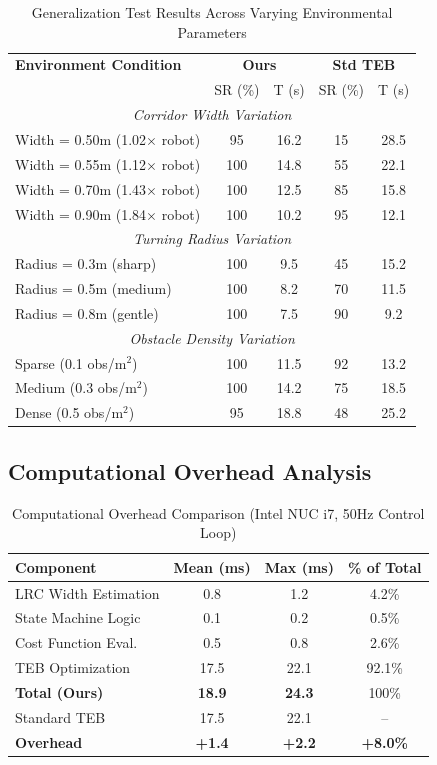 \documentclass[lettersize,journal]{IEEEtran}
\begin{document}
\begin{table}[htbp]
\centering
\caption{Generalization Test Results Across Varying Environmental Parameters}
\label{tab:generalization}
\begin{tabular}{l|cc|cc}
\hline
\textbf{Environment Condition} & \multicolumn{2}{c|}{\textbf{Ours}} & \multicolumn{2}{c}{\textbf{Std TEB}} \\
 & SR (\%) & T (s) & SR (\%) & T (s) \\
\hline
\multicolumn{5}{c}{\textit{Corridor Width Variation}} \\
\hline
Width = 0.50m (1.02$\times$ robot) & 95 & 16.2 & 15 & 28.5 \\
Width = 0.55m (1.12$\times$ robot) & 100 & 14.8 & 55 & 22.1 \\
Width = 0.70m (1.43$\times$ robot) & 100 & 12.5 & 85 & 15.8 \\
Width = 0.90m (1.84$\times$ robot) & 100 & 10.2 & 95 & 12.1 \\
\hline
\multicolumn{5}{c}{\textit{Turning Radius Variation}} \\
\hline
Radius = 0.3m (sharp) & 100 & 9.5 & 45 & 15.2 \\
Radius = 0.5m (medium) & 100 & 8.2 & 70 & 11.5 \\
Radius = 0.8m (gentle) & 100 & 7.5 & 90 & 9.2 \\
\hline
\multicolumn{5}{c}{\textit{Obstacle Density Variation}} \\
\hline
Sparse (0.1 obs/m$^2$) & 100 & 11.5 & 92 & 13.2 \\
Medium (0.3 obs/m$^2$) & 100 & 14.2 & 75 & 18.5 \\
Dense (0.5 obs/m$^2$) & 95 & 18.8 & 48 & 25.2 \\
\hline
\end{tabular}
\end{table}

\subsection{Computational Overhead Analysis}

\begin{table}[htbp]
\centering
\caption{Computational Overhead Comparison (Intel NUC i7, 50Hz Control Loop)}
\label{tab:computation}
\begin{tabular}{l|ccc}
\hline
\textbf{Component} & \textbf{Mean (ms)} & \textbf{Max (ms)} & \textbf{\% of Total} \\
\hline
LRC Width Estimation & 0.8 & 1.2 & 4.2\% \\
State Machine Logic & 0.1 & 0.2 & 0.5\% \\
Cost Function Eval. & 0.5 & 0.8 & 2.6\% \\
TEB Optimization & 17.5 & 22.1 & 92.1\% \\
\hline
\textbf{Total (Ours)} & \textbf{18.9} & \textbf{24.3} & 100\% \\
Standard TEB & 17.5 & 22.1 & -- \\
\hline
\textbf{Overhead} & \textbf{+1.4} & \textbf{+2.2} & \textbf{+8.0\%} \\
\hline
\end{tabular}
\end{table}
\end{document}
